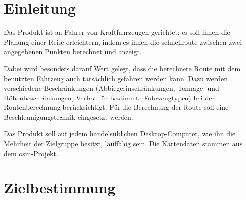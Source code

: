 \documentclass[a4paper, 11pt]{article}
\begin{document}

\section{Einleitung}

Das Produkt ist an Fahrer von Kraftfahrzeugen gerichtet; es soll ihnen die Planung einer Reise erleichtern, indem es ihnen die \gls{schnellroute} zwischen zwei angegebenen Punkten berechnet und anzeigt.

Dabei wird besonders darauf Wert gelegt, dass die berechnete Route mit dem benutzten Fahrzeug auch tatsächlich gefahren werden kann. Dazu werden verschiedene Beschränkungen (Abbiegeeinschränkungen, Tonnage- und Höhenbeschränkungen, Verbot für bestimmte Fahrzeugtypen) bei der Routenberechnung berücksichtigt. Für die Berechnung der Route soll eine Beschleunigungstechnik eingesetzt werden.

Das Produkt soll auf jedem handelsüblichen Desktop-Computer, wie ihn die Mehrheit der Zielgruppe besitzt, lauffähig sein. Die Kartendaten stammen aus dem \gls{osm}-Projekt.

\section{Zielbestimmung}
\end{document}
